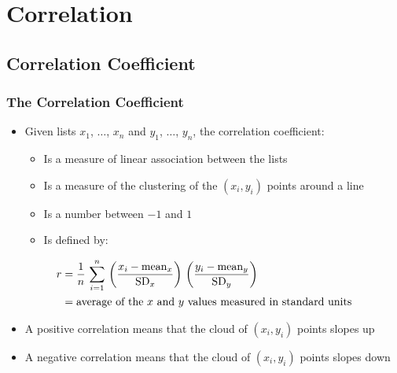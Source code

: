 \documentclass[t]{beamer}
\begin{document}
\section{Correlation}
\subsection{Correlation Coefficient}
\begin{frame}[t]\frametitle{The Correlation Coefficient}
{\small
\begin{itemize}
\item Given lists $x_1$, $\dots$, $x_n$ and $y_1$, $\dots$, $y_n$, the correlation
  coefficient:
  \begin{itemize} 
     \item Is a measure of linear association between the lists
     \item Is a measure of the clustering of the $(x_i, y_i)$ points around a line
     \item Is a number between $-1$ and $1$
     \item Is defined by:\vspace{-10pt}
   \end{itemize}
\end{itemize}
\begin{align*}
r &=\frac{1}{n}\,\sum_{i=1}^n\,\left(\frac{x_i - \mbox{mean}_x}{\mbox{SD}_x}\right)\,
  \left(\frac{y_i - \mbox{mean}_y}{\mbox{SD}_y}\right)\\
  &= \mbox{average of the $x$ and $y$ values measured in standard units}\vspace{-20pt}
\end{align*}\vspace{-15pt}
\begin{itemize}
\item A positive correlation means that the cloud of $(x_i, y_i)$ points slopes up
\item A negative correlation means that the cloud of $(x_i, y_i)$ points slopes down
\end{itemize}

}
\end{frame}
\end{document}
